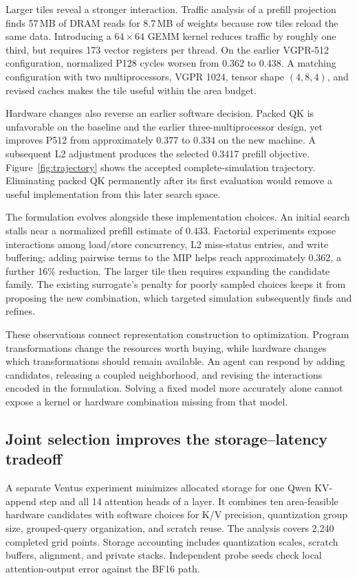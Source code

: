 Larger tiles reveal a stronger interaction. Traffic analysis of a prefill projection finds 57\,MB of DRAM reads for 8.7\,MB of weights because row tiles reload the same data. Introducing a $64\times64$ GEMM kernel reduces traffic by roughly one third, but requires 173 vector registers per thread. On the earlier VGPR-512 configuration, normalized P128 cycles worsen from 0.362 to 0.438. A matching configuration with two multiprocessors, VGPR 1024, tensor shape $(4,8,4)$, and revised caches makes the tile useful within the area budget.

Hardware changes also reverse an earlier software decision. Packed QK is unfavorable on the baseline and the earlier three-multiprocessor design, yet improves P512 from approximately 0.377 to 0.334 on the new machine. A subsequent L2 adjustment produces the selected 0.3417 prefill objective. Figure~\ref{fig:trajectory} shows the accepted complete-simulation trajectory. Eliminating packed QK permanently after its first evaluation would remove a useful implementation from this later search space.



The formulation evolves alongside these implementation choices. An initial search stalls near a normalized prefill estimate of 0.433. Factorial experiments expose interactions among load/store concurrency, L2 miss-status entries, and write buffering; adding pairwise terms to the MIP helps reach approximately 0.362, a further 16\% reduction. The larger tile then requires expanding the candidate family. The existing surrogate's penalty for poorly sampled choices keeps it from proposing the new combination, which targeted simulation subsequently finds and refines.

These observations connect representation construction to optimization. Program transformations change the resources worth buying, while hardware changes which transformations should remain available. An agent can respond by adding candidates, releasing a coupled neighborhood, and revising the interactions encoded in the formulation. Solving a fixed model more accurately alone cannot expose a kernel or hardware combination missing from that model.

\subsection{Joint selection improves the storage--latency tradeoff}\label{sec:storage-results}
A separate Ventus experiment minimizes allocated storage for one Qwen KV-append step and all 14 attention heads of a layer. It combines ten area-feasible hardware candidates with software choices for K/V precision, quantization group size, grouped-query organization, and scratch reuse. The analysis covers 2,240 completed grid points. Storage accounting includes quantization scales, scratch buffers, alignment, and private stacks. Independent probe seeds check local attention-output error against the BF16 path.

